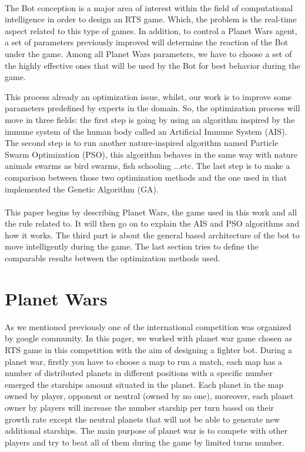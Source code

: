\documentclass[]{interact}
\theoremstyle{plain}%
\theoremstyle{definition}
\theoremstyle{remark}
\begin{document}
\paragraph*{}
The Bot conception is a major area of interest\cite{doc4} within the field of computational intelligence in order to design an RTS game. Which, the problem is the real-time aspect related to this type of games. In addition, to control a Planet Wars agent, a set of parameters previously improved will determine the reaction of the Bot under the game. Among all Planet Wars parameters, we have to choose a set of the highly effective ones\cite{doc5} that will be used by the Bot for best behavior during the game.\par
This process already an optimization issue\cite{doc5}, whilst, our work is to improve some parameters predefined by experts in the domain. So, the optimization process will move in three fields: the first step is going by using an algorithm inspired by the immune system of the human body called an Artificial Immune System (AIS). The second step is to run another nature-inspired algorithm named Particle Swarm Optimization (PSO), this algorithm behaves in the same way with nature animals swarms as bird swarms, fish schooling ...etc. The last step is to make a comparison between those two optimization methods and the one used in\cite{doc1} that implemented the Genetic Algorithm (GA).

\paragraph*{}
This paper begins by describing Planet Wars, the game used in this work and all the rule related to. It will then go on to explain the AIS and PSO algorithms and how it works. The third part is about the general based architecture of the bot to move intelligently during the game. The last section tries to define the comparable results between the optimization methods used.

\section{Planet Wars}

As we mentioned previously one of the international competition was organized by google community. In this pager, we worked with planet war game chosen as RTS game in this competition with the aim of designing a fighter bot. During a planet war\cite{doc1}, firstly you have to choose a map to run a match, each map has a number of distributed planets in different positions with a specific number emerged the starships amount situated in the planet\cite{lucas}. Each planet in the map owned by player, opponent or neutral (owned by no one), moreover, each planet owner by players will increase the number starship per turn based on their growth rate except the neutral planets that will not be able to generate new additional starships. The main purpose of planet war\cite{doc1} is to compete with other players and try to beat all of them during the game by limited turns number.  \\
\end{document}
